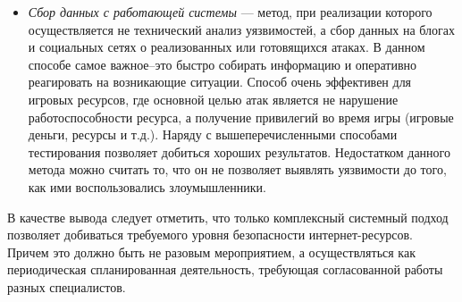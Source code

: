 \documentclass[10pt, a5paper]{article}
\begin{document}
\begin{itemize}
  \item \emph{Сбор данных с работающей системы} --- метод, при реализации которого осуществляется не технический анализ уязвимостей, а сбор данных на блогах  и социальных сетях о реализованных или готовящихся атаках. В данном способе самое важное--это быстро собирать информацию и оперативно реагировать на возникающие ситуации. Способ очень эффективен для игровых ресурсов, где основной целью атак является не нарушение работоспособности ресурса, а получение привилегий во время игры (игровые деньги, ресурсы и т.д.). Наряду с вышеперечисленными способами тестирования позволяет добиться хороших результатов. Недостатком данного метода можно считать то, что он не позволяет выявлять уязвимости до того, как ими воспользовались злоумышленники.
\end{itemize}

В качестве вывода следует отметить, что только комплексный системный подход позволяет добиваться требуемого уровня безопасности интернет-ресурсов. Причем это должно быть не разовым мероприятием, а осуществляться как периодическая спланированная деятельность, требующая согласованной работы разных специалистов.
\end{document}
